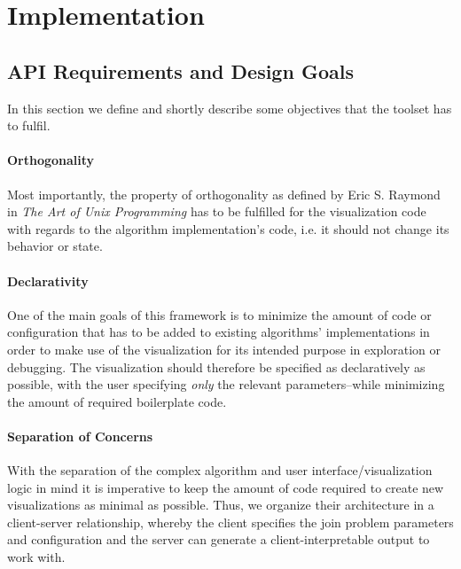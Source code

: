 \section{Implementation}
\label{sec:implementation}

\subsection{API Requirements and Design Goals}
\label{subsub:api-requirements-goals}

In this section we define and shortly describe some objectives that the toolset has to fulfil. 

\paragraph{Orthogonality}
Most importantly, the property  of orthogonality 
as defined by Eric S. Raymond in \textit{The Art of Unix
Programming} \cite{raymond2003compactness} has to be fulfilled for the visualization code with regards to the algorithm implementation's code, i.e. it should not change its behavior or state.

\paragraph{Declarativity} One of the main goals of this framework is to minimize 
the amount of code or configuration that has to be added to existing algorithms' implementations in order to make use of the visualization for its intended purpose in exploration or debugging. The visualization should therefore be specified as declaratively as 
possible, with the user specifying \textit{only} the relevant parameters–while minimizing the amount of required boilerplate code.

\paragraph{Separation of Concerns}
With the separation of the complex algorithm and user interface/visualization logic in mind it is imperative to keep the amount of code required to create new visualizations as minimal as possible. 
Thus, we organize their architecture in a client-server 
relationship, whereby the client specifies the join 
problem parameters and configuration and the server can
generate a client-interpretable output to work with.


